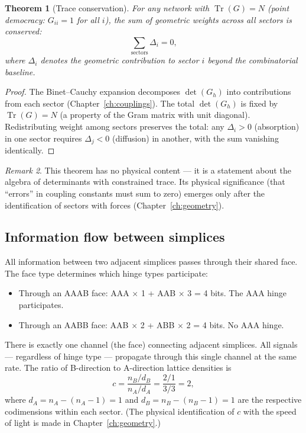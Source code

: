 \documentclass[12pt]{article}
\newtheorem{theorem}{Theorem}[section]
\theoremstyle{remark}
\newtheorem{remark}[theorem]{Remark}
\theoremstyle{definition}
\begin{document}
\begin{theorem}[Trace conservation]
\label{thm:trace_conservation}
For any network with $\operatorname{Tr}(G) = N$ (point democracy: $G_{ii} = 1$ for all $i$), the sum of geometric weights across all sectors is conserved:
\begin{equation}
\sum_{\text{sectors}} \Delta_i = 0,
\end{equation}
where $\Delta_i$ denotes the geometric contribution to sector $i$ beyond the combinatorial baseline.
\end{theorem}

\begin{proof}
The Binet--Cauchy expansion decomposes $\det(G_h)$ into contributions from each sector (Chapter~\ref{ch:couplings}). The total $\det(G_h)$ is fixed by $\operatorname{Tr}(G) = N$ (a property of the Gram matrix with unit diagonal). Redistributing weight among sectors preserves the total: any $\Delta_i > 0$ (absorption) in one sector requires $\Delta_j < 0$ (diffusion) in another, with the sum vanishing identically.
\end{proof}

\begin{remark}
This theorem has no physical content --- it is a statement about the algebra of determinants with constrained trace. Its physical significance (that ``errors'' in coupling constants must sum to zero) emerges only after the identification of sectors with forces (Chapter~\ref{ch:geometry}).
\end{remark}

\subsection{Information flow between simplices}

All information between two adjacent simplices passes through their shared face. The face type determines which hinge types participate:

\begin{itemize}
\item Through an AAAB face: AAA $\times$ 1 + AAB $\times$ 3 = 4 bits. The AAA hinge participates.
\item Through an AABB face: AAB $\times$ 2 + ABB $\times$ 2 = 4 bits. No AAA hinge.
\end{itemize}

There is exactly one channel (the face) connecting adjacent simplices. All signals --- regardless of hinge type --- propagate through this single channel at the same rate. The ratio of B-direction to A-direction lattice densities is
\begin{equation}
c = \frac{n_B / d_B}{n_A / d_A} = \frac{2/1}{3/3} = 2,
\label{eq:c_geometric}
\end{equation}
where $d_A = n_A - (n_A - 1) = 1$ and $d_B = n_B - (n_B - 1) = 1$ are the respective codimensions within each sector. (The physical identification of $c$ with the speed of light is made in Chapter~\ref{ch:geometry}.)
\end{document}
